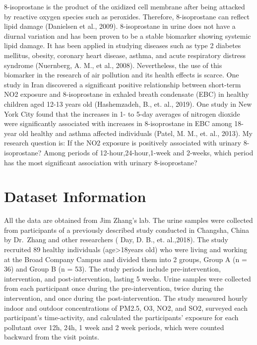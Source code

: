 \documentclass[12pt,]{article}
\begin{document}
8-isoprostane is the product of the oxidized cell membrane after being
attacked by reactive oxygen species such as peroxides. Therefore,
8-isoprostane can reflect lipid damage (Danielsen et al., 2009).
8-isoprostane in urine does not have a diurnal variation and has been
proven to be a stable biomarker showing systemic lipid damage. It has
been applied in studying diseases such as type 2 diabetes mellitus,
obesity, coronary heart disease, asthma, and acute respiratory distress
syndrome (Nuernberg, A. M., et al., 2008). Nevertheless, the use of this
biomarker in the research of air pollution and its health effects is
scarce. One study in Iran discovered a significant positive relationship
between short-term NO2 exposure and 8-isoprostane in exhaled breath
condensate (EBC) in healthy children aged 12-13 years old (Hashemzadeh,
B., et. al., 2019). One study in New York City found that the increases
in 1- to 5-day averages of nitrogen dioxide were significantly
associated with increases in 8-isoprostane in EBC among 18-year old
healthy and asthma affected individuals (Patel, M. M., et. al., 2013).
My research question is: If the NO2 exposure is positively associated
with urinary 8-isoprostane? Among periods of 12-hour,24-hour,1-week and
2-weeks, which period has the most significant association with urinary
8-isoprostane?

\hypertarget{dataset-information}{%
\section{Dataset Information}\label{dataset-information}}

All the data are obtained from Jim Zhang's lab. The urine samples were
collected from participants of a previously described study conducted in
Changsha, China by Dr.~Zhang and other researchers ( Day, D. B., et.
al.,2018). The study recruited 89 healthy individuals
(age\textgreater18years old) who were living and working at the Broad
Company Campus and divided them into 2 groups, Group A (n = 36) and
Group B (n = 53). The study periods include pre-intervention,
intervention, and post-intervention, lasting 5 weeks. Urine samples were
collected from each participant once during the pre-intervention, twice
during the intervention, and once during the post-intervention. The
study measured hourly indoor and outdoor concentrations of PM2.5, O3,
NO2, and SO2, surveyed each participant's time-activity, and calculated
the participants' exposure for each pollutant over 12h, 24h, 1 week and
2 week periods, which were counted backward from the visit points.
\end{document}
